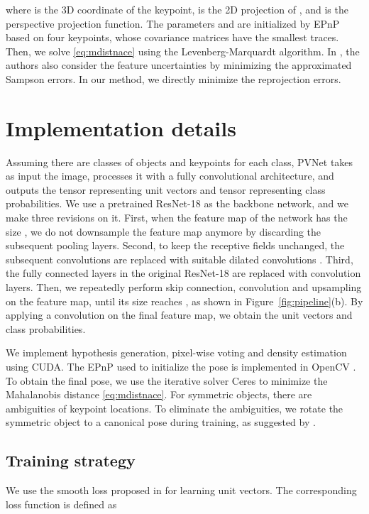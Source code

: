 \documentclass[10pt,twocolumn,letterpaper]{article}
\begin{document}
where  is the 3D coordinate of the keypoint,  is the 2D projection of , and  is the perspective projection function. The parameters  and  are initialized by EPnP \cite{lepetit2009epnp} based on four keypoints, whose covariance matrices have the smallest traces. Then, we solve \eqref{eq:mdistnace} using the Levenberg-Marquardt algorithm. In \cite{ferraz2014leveraging}, the authors also consider the feature uncertainties by minimizing the approximated Sampson errors. In our method, we directly minimize the reprojection errors.
 \section{Implementation details}
Assuming there are  classes of objects and  keypoints for each class, PVNet takes as input the  image, processes it with a fully convolutional architecture, and outputs the  tensor representing unit vectors and  tensor representing class probabilities. We use a pretrained ResNet-18 \cite{he2016deep} as the backbone network, and we make three revisions on it. First, when the feature map of the network has the size , we do not downsample the feature map anymore by discarding the subsequent pooling layers. Second, to keep the receptive fields unchanged, the subsequent convolutions are replaced with suitable dilated convolutions \cite{YuKoltun2016}. Third, the fully connected layers in the original ResNet-18 are replaced with convolution layers. 
Then, we repeatedly perform skip connection, convolution and upsampling on the feature map, until its size reaches , as shown in Figure~\ref{fig:pipeline}(b). 
By applying a  convolution on the final feature map, we obtain the unit vectors and class probabilities.

We implement hypothesis generation, pixel-wise voting and density estimation using CUDA. The EPnP \cite{lepetit2009epnp} used to initialize the pose is implemented in OpenCV \cite{bradski2000opencv}. To obtain the final pose, we use the iterative solver Ceres \cite{ceres-solver} to minimize the Mahalanobis distance \eqref{eq:mdistnace}. For symmetric objects, there are ambiguities of keypoint locations. To eliminate the ambiguities, we rotate the symmetric object to a canonical pose during training, as suggested by \cite{rad2017bb8}.

\subsection{Training strategy}

We use the smooth  loss proposed in \cite{girshick2015fast} for learning unit vectors. The corresponding loss function is defined as
\end{document}
